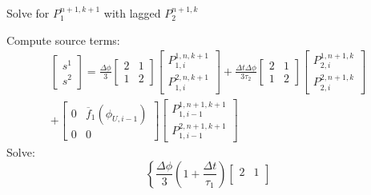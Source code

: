 \documentclass[12pt,a4paper,pagesize=pdftex]{scrartcl}
\begin{document}
\begin{algorithm}[H]
    \caption*{Solve for \(P_1^{n+1,k+1}\) with lagged \(P_2^{n+1,k}\)}
    \begin{algorithmic}
            \STATE Compute source terms:
            \begin{multline*}
                \begin{bmatrix}
                    s^1 \\
                    s^2
                \end{bmatrix}
                = \frac{\Delta \phi}{3}
                \begin{bmatrix}
                    2 & 1 \\
                    1 & 2
                \end{bmatrix}
                \begin{bmatrix}
                    P_{1,i}^{1,n,k+1} \\
                    P_{1,i}^{2,n,k+1}
                \end{bmatrix}
                + \frac{\Delta t \Delta \phi}{3 \tau_2}
                \begin{bmatrix}
                    2 & 1 \\
                    1 & 2
                \end{bmatrix}
                \begin{bmatrix}
                    P_{2,i}^{1,n+1,k} \\
                    P_{2,i}^{2,n+1,k}
                \end{bmatrix} \\
                +
                \begin{bmatrix}
                    0 & \overline{f}_1\left(\phi_{U,i-1}\right) \\
                    0 & 0
                \end{bmatrix}
                \begin{bmatrix}
                    P_{1,i-1}^{1,n+1,k+1} \\
                    P_{1,i-1}^{2,n+1,k+1}
                \end{bmatrix}
            \end{multline*}
            \STATE Solve:
            \begin{equation*}
                \left\{\frac{\Delta \phi}{3}\left(1 + \frac{\Delta t}{\tau_1}\right)
                \begin{bmatrix}
                    2 & 1 \\

\end{bmatrix}
\end{equation*}
\end{algorithmic}
\end{algorithm}
\end{document}
